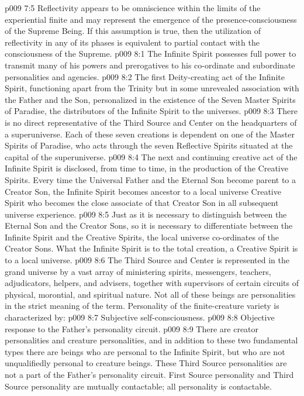 \vs p009 7:5 Reflectivity appears to be omniscience within the limits of the experiential finite and may represent the emergence of the presence\hyp{}consciousness of the Supreme Being. If this assumption is true, then the utilization of reflectivity in any of its phases is equivalent to partial contact with the consciousness of the Supreme.\plusone
{}
\vs p009 8:1 The Infinite Spirit possesses full power to transmit many of his powers and prerogatives to his co\hyp{}ordinate and subordinate personalities and agencies.
\vs p009 8:2 The first Deity\hyp{}creating act of the Infinite Spirit, functioning apart from the Trinity but in some unrevealed association with the Father and the Son, personalized in the existence of the Seven Master Spirits of Paradise, the distributors of the Infinite Spirit to the universes.
\vs p009 8:3 There is no direct representative of the Third Source and Center on the headquarters of a superuniverse. Each of these seven creations is dependent on one of the Master Spirits of Paradise, who acts through the seven Reflective Spirits situated at the capital of the superuniverse.
\vs p009 8:4 The next and continuing creative act of the Infinite Spirit is disclosed, from time to time, in the production of the Creative Spirits. Every time the Universal Father and the Eternal Son become parent to a Creator Son, the Infinite Spirit becomes ancestor to a local universe Creative Spirit who becomes the close associate of that Creator Son in all subsequent universe experience.
\vs p009 8:5 Just as it is necessary to distinguish between the Eternal Son and the Creator Sons, so it is necessary to differentiate between the Infinite Spirit and the Creative Spirits, the local universe co\hyp{}ordinates of the Creator Sons. What the Infinite Spirit is to the total creation, a Creative Spirit is to a local universe.\plusone
\pc \vs p009 8:6 The Third Source and Center is represented in the grand universe by a vast array of ministering spirits, messengers, teachers, adjudicators, helpers, and advisers, together with supervisors of certain circuits of physical, morontial, and spiritual nature. Not all of these beings are personalities in the strict meaning of the term. Personality of the finite\hyp{}creature variety is characterized by:
\pc \vs p009 8:7 \bibnobreakspace Subjective self\hyp{}consciousness.
\vs p009 8:8 \bibnobreakspace Objective response to the Father’s personality circuit.
\pc \vs p009 8:9 There are creator personalities and creature personalities, and in addition to these two fundamental types there are  beings who are personal to the Infinite Spirit, but who are not unqualifiedly personal to creature beings. These Third Source personalities are not a part of the Father’s personality circuit. First Source personality and Third Source personality are mutually contactable; all personality is contactable.
